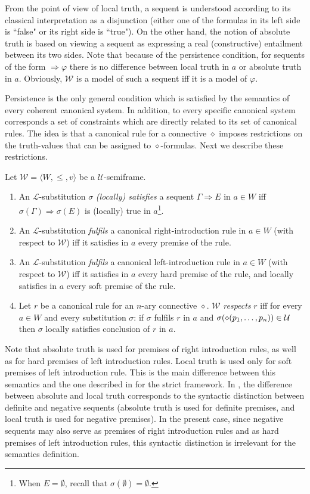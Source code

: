 \documentclass{LMCS}
\theoremstyle{remark}
\newcommand{\lp}{\mathcal{L}}
\newcommand{\U}{\mathcal{U}}
\newcommand{\W}{\mathcal{W}}
\newcommand{\dd}{\diamond}
\newcommand{\ptil}{p_1 \til p_n}
\newcommand{\be}{\begin{enumerate}[(1)]}
\newcommand{\ee}{\end{enumerate}}
\newcommand{\Ra}{\Rightarrow}
\newcommand{\g}{\Gamma}
\newcommand{\tup}[1]{\langle #1 \rangle}
\newcommand{\fe}{\varphi}
\begin{document}
\begin{rem}
From the point of view of local truth, a sequent 
is understood according to its classical interpretation as a disjunction
(either one of the formulas in its left side is ``false" or its right side is ``true").
On the other hand, the notion of absolute truth is based on viewing 
a sequent as expressing a real (constructive) entailment between its two sides.
Note that because of the persistence condition, 
for sequents of the form $\Ra\fe$ there is no difference between
local truth in $a$ or absolute truth in $a$.
Obviously, ${\W}$ is a model of such a sequent iff it is a model of $\fe$.
\end{rem}

Persistence is the only general condition which is satisfied by the semantics of
every coherent canonical system.
In addition, to every specific canonical system corresponds a set of constraints 
which are directly related to its set of canonical rules.
The idea is that a canonical rule for a connective $\dd$
imposes restrictions on the truth-values that can be 
assigned to $\diamond$-formulas.
Next we describe these restrictions.

\begin{defi}
\label{substitution satisfaction, fulfil and respect} 
Let $\W=\tup{W,\leq,v}$ be a $\U$-semiframe.
\be
\item 
An $\lp$-substitution $\sigma$ {\em (locally) satisfies} a sequent $\g\Ra E$ in 
$a\in W$ iff $\sigma(\g)\Ra\sigma(E)$ is (locally) true in $a$\footnote{When $E=\emptyset$, recall that $\sigma(\emptyset)=\emptyset$.}.
\item 
An $\lp$-substitution {\em fulfils} a canonical right-introduction rule in
$a \in W$ (with respect to $\W$) iff it satisfies in $a$ every premise of the rule.
\item
An $\lp$-substitution {\em fulfils} a canonical left-introduction rule in
$a \in W$ (with respect to $\W$) iff it satisfies in $a$ every hard premise of the rule,
and locally satisfies in $a$ every soft premise of the rule.
\item
Let $r$ be a canonical rule for an $n$-ary connective $\diamond$.
$\W$ {\em respects} $r$
iff for every $a\in W$ and every substitution $\sigma$:
if $\sigma$ fulfils $r$ in $a$ and $\sigma(\diamond(\ptil))\in\U$
then $\sigma$ locally satisfies conclusion of $r$ in $a$.
\ee
\end{defi}

\noindent Note that absolute truth is used for premises of right
introduction rules, as well as for hard premises of left introduction
rules.  Local truth is used only for soft premises of left
introduction rule.  This is the main difference between this semantics
and the one described in \cite{AL10} for the strict framework.  In
\cite{AL10}, the difference between absolute and local truth
corresponds to the syntactic distinction between definite and negative
sequents (absolute truth is used for definite premises, and local
truth is used for negative premises).  In the present case, since
negative sequents may also serve as premises of right introduction
rules and as hard premises of left introduction rules, this syntactic
distinction is irrelevant for the semantics definition.
\end{document}
